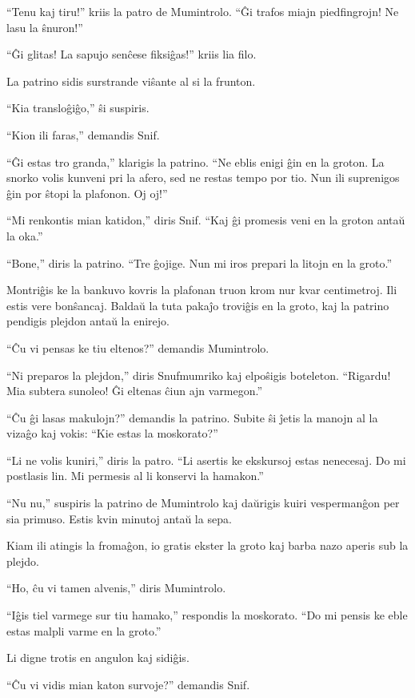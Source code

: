 ``Tenu kaj tiru!'' kriis la patro de Mumintrolo. ``Ĝi trafos miajn piedfingrojn! Ne lasu la ŝnuron!''

``Ĝi glitas! La sapujo senĉese fiksiĝas!'' kriis lia filo.

La patrino sidis surstrande viŝante al si la frunton.

``Kia transloĝiĝo,'' ŝi suspiris.

``Kion ili faras,'' demandis Snif.

``Ĝi estas tro granda,'' klarigis la patrino. ``Ne eblis enigi ĝin en la groton. La snorko volis kunveni pri la afero, sed ne restas tempo por tio. Nun ili suprenigos ĝin por ŝtopi la plafonon. Oj oj!''

``Mi renkontis mian katidon,'' diris Snif. ``Kaj ĝi promesis veni en la groton antaŭ la oka.''

``Bone,'' diris la patrino. ``Tre ĝojige. Nun mi iros prepari la litojn en la groto.''

Montriĝis ke la bankuvo kovris la plafonan truon krom nur kvar centimetroj. Ili estis vere bonŝancaj. Baldaŭ la tuta pakaĵo troviĝis en la groto, kaj la patrino pendigis plejdon antaŭ la enirejo.

``Ĉu vi pensas ke tiu eltenos?'' demandis Mumintrolo.

``Ni preparos la plejdon,'' diris Snufmumriko kaj elpoŝigis boteleton. ``Rigardu! Mia subtera sunoleo! Ĝi eltenas ĉiun ajn varmegon.''

``Ĉu ĝi lasas makulojn?'' demandis la patrino. Subite ŝi ĵetis la manojn al la vizaĝo kaj vokis: ``Kie estas la moskorato?''

``Li ne volis kuniri,'' diris la patro. ``Li asertis ke ekskursoj estas nenecesaj. Do mi postlasis lin. Mi permesis al li konservi la hamakon.''

``Nu nu,'' suspiris la patrino de Mumintrolo kaj daŭrigis kuiri vespermanĝon per sia primuso. Estis kvin minutoj antaŭ la sepa.

\sectionbreak

Kiam ili atingis la fromaĝon, io gratis ekster la groto kaj barba nazo aperis sub la plejdo.

``Ho, ĉu vi tamen alvenis,'' diris Mumintrolo.

``Iĝis tiel varmege sur tiu hamako,'' respondis la moskorato. ``Do mi pensis ke eble estas malpli varme en la groto.''

Li digne trotis en angulon kaj sidiĝis.

``Ĉu vi vidis mian katon survoje?'' demandis Snif.


